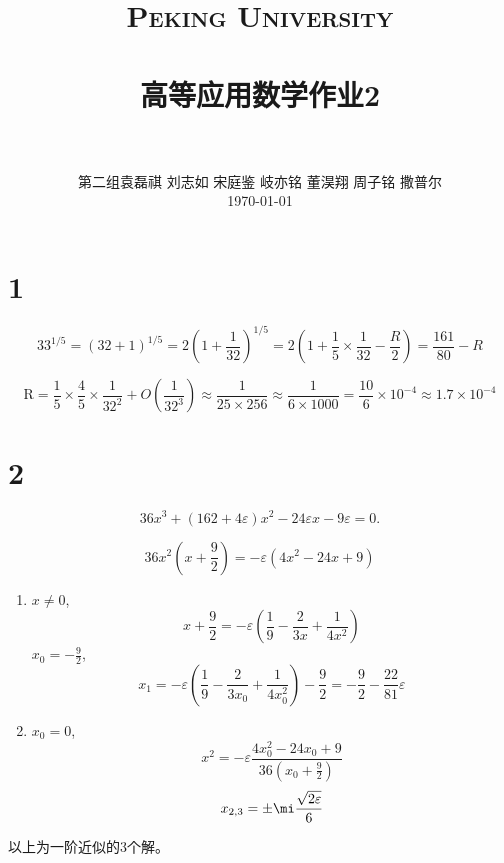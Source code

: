 \documentclass[12pt]{article}
\title{
		\vspace{-1in} 	
		\usefont{OT1}{bch}{b}{n}
		\normalfont \normalsize \textsc{\LARGE Peking University}\\[1cm] %
		\horrule{0.5pt} \\[0.5cm]
		\huge \bfseries{高等应用数学作业2} \\
		\horrule{2pt} \\[0.5cm]
}
\author{
		\normalfont 								\normalsize
		第二组\quad 袁磊祺 \quad 刘志如 \quad 宋庭鉴 \quad 岐亦铭 \quad 董淏翔 \quad 周子铭 \quad 撒普尔\\	\normalsize
        \today
}
\date{}
\begin{document}


\maketitle

\section{1}

\begin{equation}
	33^{1 / 5}=(32+1)^{1 / 5}=2\left(1+\frac{1}{32}\right)^{1 / 5}=2\left(1+\frac{1}{5} \times \frac{1}{32}-\frac{R}{2}\right)=\frac{161}{80}-R
\end{equation}

\begin{equation}
	\mathrm{R}=\frac{1}{5} \times \frac{4}{5} \times \frac{1}{32^{2}}+O\left(\frac{1}{32^{3}}\right) \approx \frac{1}{25 \times 256} \approx \frac{1}{6 \times 1000}=\frac{10}{6} \times 10^{-4} \approx 1.7 \times 10^{-4}
\end{equation}

\section{2}

\begin{equation}
	36x^3 + (162 + 4\varepsilon)x^2-24\varepsilon x - 9\varepsilon = 0.
\end{equation}

\begin{equation}
	36x^2\left(x + \frac{9}{2}\right) = - \varepsilon (4x^2 - 24x + 9)
\end{equation}

\begin{enumerate}
	\item $x\not= 0$,
	\begin{equation}
		x + \frac{9}{2} = - \varepsilon\left(\frac{1}{9}-\frac{2}{3x}+\frac{1}{4x^2}\right)
	\end{equation}
	$x_0 = -\frac{9}{2}$,
	\begin{equation}
		x_1 = -\varepsilon\left(\frac{1}{9}-\frac{2}{3x_0}+\frac{1}{4x_0^2}\right) - \frac{9}{2} = - \frac{9}{2} - \frac{22}{81} \varepsilon
	\end{equation}
	\item $x_0 = 0$,
	\begin{equation}
		x^2 = -\varepsilon \frac{4x_0^2-24x_0+9}{36\left(x_0+\frac{9}{2}\right) }
	\end{equation}
	\begin{equation}
		x_{2,3} = \pm \mi \frac{\sqrt{2\varepsilon}}{6}
	\end{equation}
\end{enumerate}
以上为一阶近似的3个解。
\end{document}
